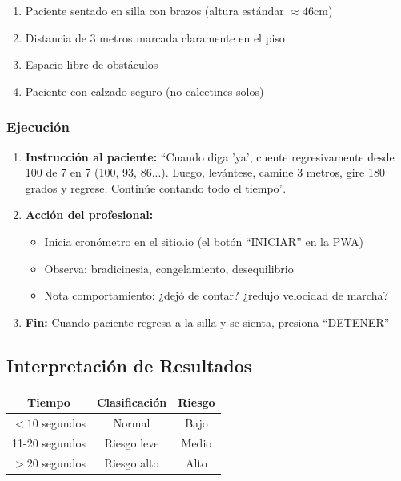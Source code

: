 \documentclass[12pt,a4paper,spanish,oneside]{book}
\begin{document}
\begin{enumerate}
  \item Paciente sentado en silla con brazos (altura estándar $\approx 46$cm)
  \item Distancia de 3 metros marcada claramente en el piso
  \item Espacio libre de obstáculos
  \item Paciente con calzado seguro (no calcetines solos)
\end{enumerate}

\subsubsection{Ejecución}

\begin{enumerate}
  \item \textbf{Instrucción al paciente:} ``Cuando diga 'ya', cuente regresivamente desde 100 de 7 en 7 (100, 93, 86...). Luego, levántese, camine 3 metros, gire 180 grados y regrese. Continúe contando todo el tiempo''.
  \item \textbf{Acción del profesional:}
  \begin{itemize}
    \item Inicia cronómetro en el sitio.io (el botón ``INICIAR'' en la PWA)
    \item Observa: bradicinesia, congelamiento, desequilibrio
    \item Nota comportamiento: ¿dejó de contar? ¿redujo velocidad de marcha?
  \end{itemize}
  \item \textbf{Fin:} Cuando paciente regresa a la silla y se sienta, presiona ``DETENER''
\end{enumerate}

\subsection{Interpretación de Resultados}

\begin{table}[h]
  \centering
  \begin{tabular}{|c|c|c|}
    \hline
    \textbf{Tiempo} & \textbf{Clasificación} & \textbf{Riesgo} \\
    \hline
    $< 10$ segundos & Normal & Bajo \\
    \hline
    11-20 segundos & Riesgo leve & Medio \\
    \hline
    $> 20$ segundos & Riesgo alto & Alto \\
    \hline
  \end{tabular}
\end{table}
\end{document}
